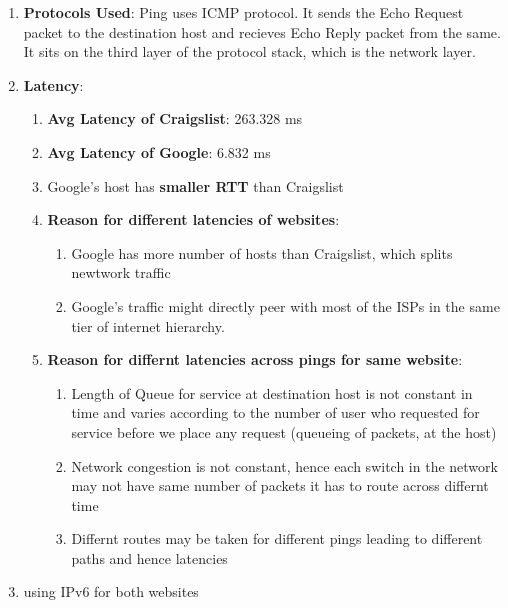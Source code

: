 \documentclass[12pt]{article}
\begin{document}
\begin{enumerate}
    \item \textbf{Protocols Used}: Ping uses ICMP protocol. It sends the Echo Request packet to the destination host and recieves Echo Reply packet from the same. It sits on the third layer of the protocol stack, which is the network layer.
    \item \textbf{Latency}:
    \begin{enumerate}
        \item \textbf{Avg Latency of Craigslist}: 263.328 ms
        \item \textbf{Avg Latency of Google}: 6.832 ms
        \item Google's host has \textbf{smaller RTT} than Craigslist
        \item \textbf{Reason for different latencies of websites}:
        \begin{enumerate}
            \item Google has more number of hosts than Craigslist, which splits newtwork traffic
            \item Google's traffic might directly peer with most of the ISPs in the same tier of internet hierarchy.
        \end{enumerate}
        \item \textbf{Reason for differnt latencies across pings for same website}:
        \begin{enumerate}
            \item Length of Queue for service at destination host is not constant in time and varies according to the number of user who requested for service before we place any request (queueing of packets, at the host)
            \item Network congestion is not constant, hence each switch in the network may not have same number of packets it has to route across differnt time
            \item Differnt routes may be taken for different pings leading to different paths and hence latencies
        \end{enumerate}
    \end{enumerate}
    \item using IPv6 for both websites

\end{enumerate}
\end{document}
